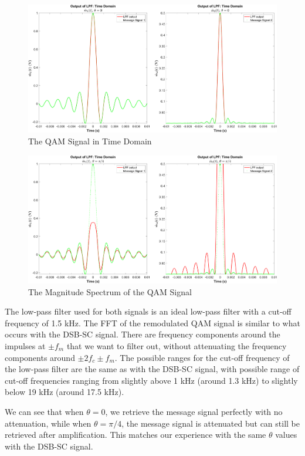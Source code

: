 \documentclass[12pt]{article}
\begin{document}
\begin{figure}[h]
    \centering
    \includegraphics[width=\textwidth]{qam_demod_lpf_theta_0}
    \caption{\label{fig:qam_demod_lpf_0}The QAM Signal in Time Domain}
\end{figure}
\begin{figure}[h]
    \centering
    \includegraphics[width=\textwidth]{qam_demod_lpf_theta_0.7854}
    \caption{\label{fig:qam_demod_lpf_p4}The Magnitude Spectrum of the QAM Signal}
\end{figure}

The low-pass filter used for both signals is an ideal low-pass filter with a cut-off frequency of 1.5 kHz. The FFT of the remodulated QAM signal is similar to what occurs with the DSB-SC signal. There are frequency components around the impulses at $\pm f_m$ that we want to filter out, without attenuating the frequency components around $\pm 2f_c \pm f_m$. The possible ranges for the cut-off frequency of the low-pass filter are the same as with the DSB-SC signal, with possible range of cut-off frequencies ranging from slightly above 1 kHz (around 1.3 kHz) to slightly below 19 kHz (around 17.5 kHz). %

We can see that when $\theta = 0$, we retrieve the message signal perfectly with no attenuation, while when $\theta = \pi/4$, the message signal is attenuated but can still be retrieved after amplification. This matches our experience with the same $\theta$ values with the DSB-SC signal. 
\end{document}
